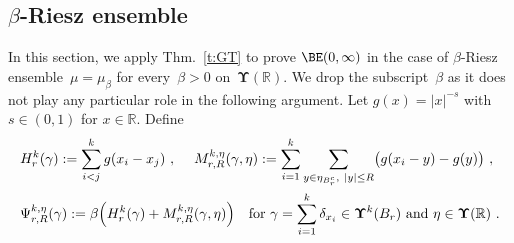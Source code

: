 \documentclass[11pt,letterpaper]{amsart}
\newcommand{\R}{{\mathbb R}}
\newcommand{\comma}{\,\,\mathrm{,}\;\,}
\newcommand{\fstop}{\,\,\mathrm{.}}
\newcommand{\QP}{{\mu}}
\newcommand{\dUpsilon}{{\mathbf \Upsilon}}
\newcommand{\U}{\dUpsilon}
\renewcommand{\1}{\mathbf 1}
\numberwithin{equation}{section}
\theoremstyle{plain}
\theoremstyle{definition}
\theoremstyle{remark}
\begin{document}
\subsection{$\beta$-Riesz ensemble}In this section, we apply Thm.~\ref{t:GT} to prove $\BE(0,\infty)$ in the case of $\beta$-Riesz ensemble~$\QP=\QP_\beta$ for every~$\beta>0$ on~$\U(\R)$. We drop the subscript~$\beta$ as it does not play any particular role in the following argument. Let $g(x)=|x|^{-s}$ with $s \in (0, 1)$ for $x \in \R$. Define 
\begin{align*}
&H^k_r(\gamma):=\sum_{i<j}^kg(x_i-x_j) \comma \quad M_{r, R}^{k, \eta}(\gamma, \eta):=\sum_{i=1}^k\sum_{y \in \eta_{B_r^c},\ |y| \le R}\bigl(g(x_i-y)-g(y)\bigr) \comma
\\
&\Psi_{r, R}^{k, \eta}(\gamma):= \beta \Bigl(H^k_r(\gamma)+M_{r, R}^{k, \eta}(\gamma, \eta)\Bigr)  \quad \text{for $\gamma=\sum_{i=1}^k \delta_{x_i} \in \U^k(B_r)$ and $\eta \in \U(\R)$} \fstop
\end{align*}
\end{document}
